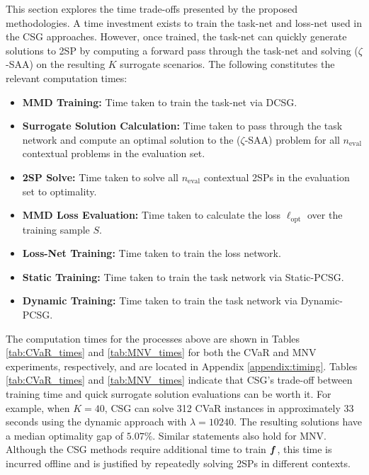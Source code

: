 This section explores the time trade-offs presented by the proposed methodologies. A time investment exists to train the task-net and loss-net used in the CSG approaches. However, once trained, the task-net can quickly generate solutions to 2SP by computing a forward pass through the task-net and solving ($\zeta$-SAA) on the resulting $K$ surrogate scenarios. The following constitutes the relevant computation times:
\begin{itemize} %
    \item \textbf{MMD Training:} Time taken to train the task-net via DCSG.
    \item \textbf{Surrogate Solution Calculation:} Time taken to pass through the task network and compute an optimal solution to the ($\zeta$-SAA) problem for all $n_{\text{eval}}$ contextual problems in the evaluation set.
    \item \textbf{2SP Solve:} Time taken to solve all $n_{\text{eval}}$ contextual 2SPs in the evaluation set to optimality.
    \item \textbf{MMD Loss Evaluation:} Time taken to calculate the loss $\ell_{\text{opt}}$ over the training sample $S$.
    \item \textbf{Loss-Net Training:} Time taken to train the loss network.
    \item \textbf{Static Training:} Time taken to train the task network via Static-PCSG.
    \item \textbf{Dynamic Training:} Time taken to train the task network via Dynamic-PCSG.
\end{itemize}



The computation times for the processes above are shown in Tables \ref{tab:CVaR_times} and \ref{tab:MNV_times} for both the CVaR and MNV experiments, respectively, and are located in Appendix \ref{appendix:timing}. Tables \ref{tab:CVaR_times} and \ref{tab:MNV_times} indicate that CSG's trade-off between training time and quick surrogate solution evaluations can be worth it. For example, when $K = 40$, CSG can solve 312 CVaR instances in approximately $33$ seconds using the dynamic approach with $\lambda = 10240$. The resulting solutions have a median optimality gap of $5.07\%$. Similar statements also hold for MNV. Although the CSG methods require additional time to train $\boldsymbol{f}$, this time is incurred offline and is justified by repeatedly solving 2SPs in different contexts. 








